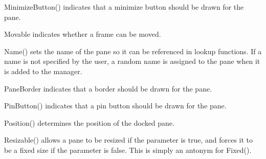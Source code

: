 \label{wxauipaneinfominimizebutton}


MinimizeButton() indicates that a minimize button should be drawn for the pane.

\label{wxauipaneinfomovable}


Movable indicates whether a frame can be moved.

\label{wxauipaneinfoname}


Name() sets the name of the pane so it can be referenced in lookup functions.  If a name is not specified by the user, a random name is assigned to the pane when it is added to the manager.

\label{wxauipaneinfopaneborder}


PaneBorder indicates that a border should be drawn for the pane.

\label{wxauipaneinfopinbutton}


PinButton() indicates that a pin button should be drawn for the pane.

\label{wxauipaneinfoposition}


Position() determines the position of the docked pane.

\label{wxauipaneinforesizable}


Resizable() allows a pane to be resized if the parameter is true, and forces it to be a fixed size if the parameter is false.  This is simply an antonym for Fixed().

\label{wxauipaneinforight}


